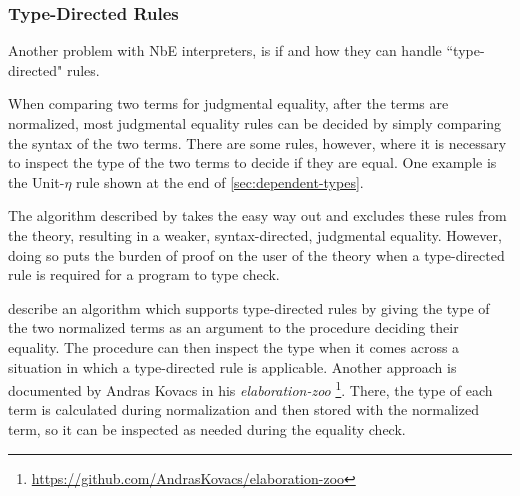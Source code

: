 
\subsubsection{Type-Directed Rules}

Another problem with NbE interpreters, is if and how they can handle ``type-directed" rules.

When comparing two terms for judgmental equality, after the terms are normalized, most judgmental equality rules can be decided by simply comparing the syntax of the two terms.
There are some rules, however, where it is necessary to inspect the type of the two terms to decide if they are equal.
One example is the Unit-$\eta$ rule shown at the end of \autoref{sec:dependent-types}.

The algorithm described by \citet{Coquand1996} takes the easy way out and excludes these rules from the theory, resulting in a weaker, syntax-directed, judgmental equality.
However, doing so puts the burden of proof on the user of the theory when a type-directed rule is required for a program to type check.

\citet{Chapman2005} describe an algorithm which supports type-directed rules by giving the type of the two normalized terms as an argument to the procedure deciding their equality.
The procedure can then inspect the type when it comes across a situation in which a type-directed rule is applicable.
Another approach is documented by Andras Kovacs in his \textit{elaboration-zoo} \footnote{\url{https://github.com/AndrasKovacs/elaboration-zoo}}.
There, the type of each term is calculated during normalization and then stored with the normalized term, so it can be inspected as needed during the equality check.


